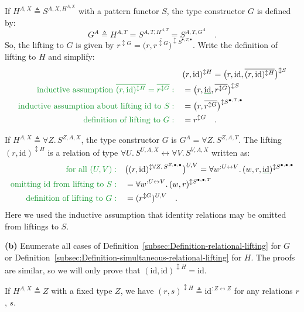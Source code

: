 If $H^{A,X}\triangleq S^{A,X,H^{A,X}}$ with a pattern functor $S$,
the type constructor $G$ is defined by: 
\[
G^{A}\triangleq H^{A,T}=S^{A,T,H^{A,T}}=S^{A,T,G^{A}}\quad.
\]
So, the lifting to $G$ is given by $r^{\updownarrow G}=\big(r,\overline{r^{\updownarrow G}}\big)^{\updownarrow S^{\bullet,T,\bullet}}$.
Write the definition of lifting to $H$ and simplify:
\begin{align*}
 & (r,\text{id})^{\updownarrow H}=\big(r,\text{id},\overline{(r,\text{id})^{\updownarrow H}}\big)^{\updownarrow S}\\
{\color{greenunder}\text{inductive assumption }\overline{(r,\text{id})^{\updownarrow H}}=\overline{r^{\updownarrow G}}:}\quad & =\big(r,\gunderline{\text{id}},\overline{r^{\updownarrow G}}\big)^{\updownarrow S}\\
{\color{greenunder}\text{inductive assumption about lifting id to }S:}\quad & =\big(r,\overline{r^{\updownarrow G}}\big)^{\updownarrow S^{\bullet,T,\bullet}}\\
{\color{greenunder}\text{definition of lifting to }G:}\quad & =r^{\updownarrow G}\quad.
\end{align*}

If $H^{A,X}\triangleq\forall Z.\,S^{Z,A,X}$, the type constructor
$G$ is $G^{A}=\forall Z.\,S^{Z,A,T}$. The lifting $(r,\text{id})^{\updownarrow H}$
is a relation of type $\forall U.\,S^{U,A,X}\leftrightarrow\forall V.\,S^{V,A,X}$
written as:
\begin{align*}
{\color{greenunder}\text{for all }(U,V):}\quad & \big((r,\text{id})^{\updownarrow\forall Z.\,S^{Z,\bullet,\bullet}}\big)^{U,V}=\forall w^{:U\leftrightarrow V}.\,(w,r,\gunderline{\text{id}})^{\updownarrow S^{\bullet,\bullet,\bullet}}\\
{\color{greenunder}\text{omitting id from lifting to }S:}\quad & =\forall w^{:U\leftrightarrow V}.\,(w,r)^{\updownarrow S^{\bullet,\bullet,T}}\\
{\color{greenunder}\text{definition of lifting to }G:}\quad & =(r^{\updownarrow G})^{U,V}\quad.
\end{align*}
Here we used the inductive assumption that identity relations may
be omitted from liftings to $S$.

\textbf{(b)} Enumerate all cases of Definition~\ref{subsec:Definition-relational-lifting}
for $G$ or Definition~\ref{subsec:Definition-simultaneous-relational-lifting}
for $H$. The proofs are similar, so we will only prove that $(\text{id},\text{id})^{\updownarrow H}=\text{id}$.

If $H^{A,X}\triangleq Z$ with a fixed type $Z$, we have $(r,s)^{\updownarrow H}\triangleq\text{id}^{:Z\leftrightarrow Z}$
for any relations $r$, $s$.

